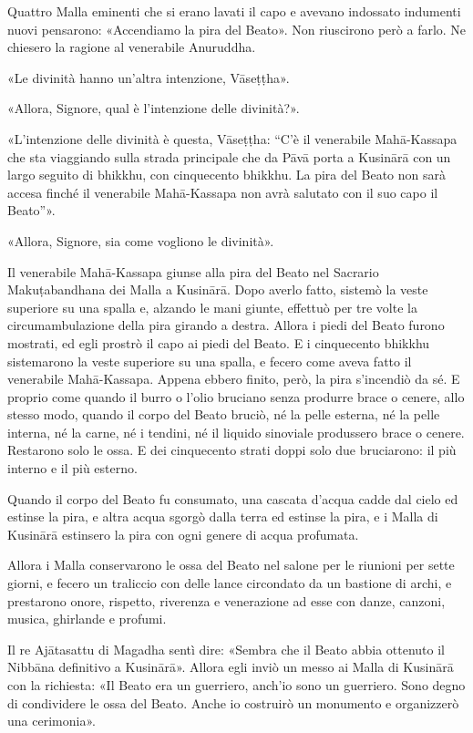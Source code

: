 

Quattro Malla eminenti che si erano lavati il capo e avevano indossato
indumenti nuovi pensarono: «Accendiamo la pira del Beato». Non
riuscirono però a farlo. Ne chiesero la ragione al venerabile Anuruddha.


«Le divinità hanno un’altra intenzione, Vāseṭṭha».


«Allora, Signore, qual è l’intenzione delle divinità?».


«L’intenzione delle divinità è questa, Vāseṭṭha: “C’è il venerabile
Mahā-Kassapa che sta viaggiando sulla strada principale che da Pāvā
porta a Kusinārā con un largo seguito di bhikkhu, con cinquecento
bhikkhu. La pira del Beato non sarà accesa finché il venerabile
Mahā-Kassapa non avrà salutato con il suo capo il Beato”».


«Allora, Signore, sia come vogliono le divinità».


Il venerabile Mahā-Kassapa giunse alla pira del Beato nel Sacrario
Makuṭabandhana dei Malla a Kusinārā. Dopo averlo fatto, sistemò la veste
superiore su una spalla e, alzando le mani giunte, effettuò per tre
volte la circumambulazione della pira girando a destra. Allora i piedi
del Beato furono mostrati, ed egli prostrò il capo ai piedi del Beato. E
i cinquecento bhikkhu sistemarono la veste superiore su una spalla, e
fecero come aveva fatto il venerabile Mahā-Kassapa. Appena ebbero
finito, però, la pira s’incendiò da sé. E proprio come quando il burro o
l’olio bruciano senza produrre brace o cenere, allo stesso modo, quando
il corpo del Beato bruciò, né la pelle esterna, né la pelle interna, né
la carne, né i tendini, né il liquido sinoviale produssero brace o
cenere. Restarono solo le ossa. E dei cinquecento strati doppi solo due
bruciarono: il più interno e il più esterno.


Quando il corpo del Beato fu consumato, una cascata d’acqua cadde dal
cielo ed estinse la pira, e altra acqua sgorgò dalla terra ed estinse la
pira, e i Malla di Kusinārā estinsero la pira con ogni genere di acqua
profumata.


Allora i Malla conservarono le ossa del Beato nel salone per le riunioni
per sette giorni, e fecero un traliccio con delle lance circondato da un
bastione di archi, e prestarono onore, rispetto, riverenza e venerazione
ad esse con danze, canzoni, musica, ghirlande e profumi.


Il re Ajātasattu di Magadha sentì dire: «Sembra che il Beato abbia
ottenuto il Nibbāna definitivo a Kusinārā». Allora egli inviò un messo
ai Malla di Kusinārā con la richiesta: «Il Beato era un guerriero,
anch’io sono un guerriero. Sono degno di condividere le ossa del Beato.
Anche io costruirò un monumento e organizzerò una cerimonia».


